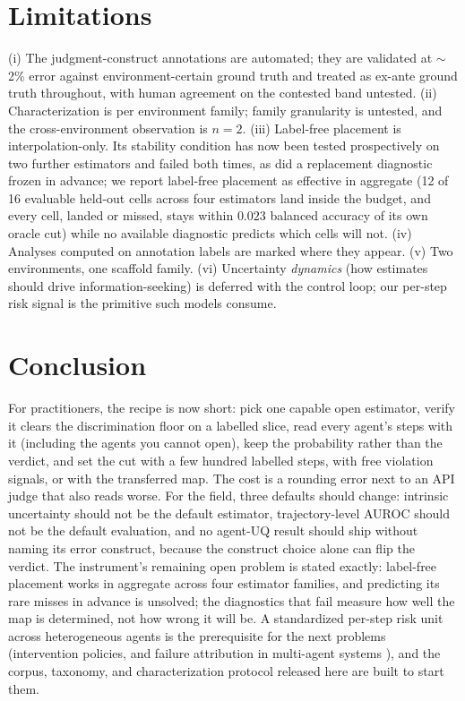 \documentclass{article}
\begin{document}
\section{Limitations}\label{sec:limits}
(i) The judgment-construct annotations are automated; they are validated at
$\sim$2\% error against environment-certain ground truth and treated as
ex-ante ground truth throughout, with human agreement on the contested band
untested.
(ii) Characterization is per environment family; family granularity is
untested, and the cross-environment observation is $n{=}2$. (iii) Label-free placement is interpolation-only. Its stability condition has
now been tested prospectively on two further estimators and failed both
times, as did a replacement diagnostic frozen in advance; we report
label-free placement as effective in aggregate (12 of 16 evaluable held-out
cells across four estimators land inside the budget, and every cell, landed
or missed, stays within $0.023$ balanced accuracy of its own oracle cut)
while no available diagnostic predicts which cells will not. (iv) Analyses computed on annotation labels are marked where they appear. (v) Two environments, one scaffold
family. (vi) Uncertainty \emph{dynamics} (how estimates should drive
information-seeking) is deferred with the control loop; our per-step risk signal is the primitive such models consume. 

\section{Conclusion}\label{sec:conc}
For practitioners, the recipe is now short: pick one capable open estimator,
verify it clears the discrimination floor on a labelled slice, read every
agent's steps with it (including the agents you cannot open), keep the
probability rather than the verdict, and set the cut with a few hundred labelled steps, with
free violation signals, or with the transferred map. The cost is a rounding
error next to an API judge that also reads worse. For the field, three
defaults should change: intrinsic uncertainty should not be the default
estimator, trajectory-level AUROC should not be the default evaluation, and
no agent-UQ result should ship without naming its error construct, because
the construct choice alone can flip the verdict. The instrument's remaining
open problem is stated exactly: label-free placement works in aggregate
across four estimator families, and predicting its rare misses in advance is
unsolved; the diagnostics that fail measure how well the map is determined,
not how wrong it will be. A standardized per-step risk unit across
heterogeneous agents is the prerequisite for the next problems
(intervention policies, and failure attribution in multi-agent systems
\citep{chen2026matu}), and the corpus, taxonomy, and characterization
protocol released here are built to start them.
\end{document}
